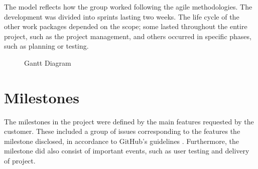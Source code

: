 The model reflects how the group worked following the agile methodologies. The development was divided into sprints lasting two weeks. The life cycle of the other work packages depended on the scope; some lasted throughout the entire project, such as the project management, and others occurred in specific phases, such as planning or testing. 


\begin{center}
  \begin{figure}[!h]
    \caption{Gantt Diagram}
    \label{Gantt_Diagram}  
  \end{figure}
\end{center}


\section{Milestones}
\label{milestones}
The milestones in the project were defined by the main features requested by the customer. These included a group of issues corresponding to the features the milestone disclosed, in accordance to GitHub's guidelines \cite{GitHubGuide}. Furthermore, the milestone did also consist of important events, such as user testing and delivery of project. 
 
